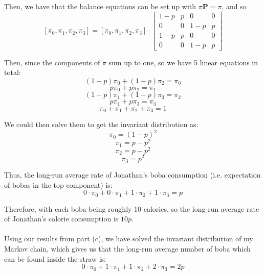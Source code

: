 \documentclass{article}
\begin{document}
Then, we have that the balance equations can be set up with $\pi\mathbf{P} = \pi$, and so
$$[\pi_0, \pi_1, \pi_2, \pi_3] = [\pi_0, \pi_1, \pi_2, \pi_3] \cdot
\begin{bmatrix}
	1-p & p & 0 & 0 \\
	0 & 0 & 1-p & p \\
	1-p & p & 0 & 0 \\
	0 & 0 & 1-p & p
\end{bmatrix} $$

Then, since the components of $\pi$ sum up to one, so we have 5 linear equations in total:
$$(1-p)\pi_0 + (1-p)\pi_2 = \pi_0 $$
$$p\pi_0 + p\pi_2 = \pi_1 $$
$$(1-p)\pi_1 + (1-p)\pi_3 = \pi_2 $$
$$p\pi_1 + p\pi_3 = \pi_3 $$
$$\pi_0 + \pi_1 + \pi_2 + \pi_3 = 1$$

We could then solve them to get the invariant distribution as:
$$\pi_0 = (1-p)^2$$
$$\pi_1 = p - p^2$$
$$\pi_2 = p - p^2$$
$$\pi_3 = p^2$$

Thus, the long-run average rate of Jonathan's boba consumption (i.e. expectation of bobas in the top component) is:
$$0\cdot\pi_0 + 0\cdot\pi_1 + 1\cdot\pi_2 + 1\cdot\pi_3 = p$$

Therefore, with each boba being roughly 10 calories, so the long-run average rate of Jonathan's calorie consumption is $10p$. \\



 \\

Using our results from part (c), we have solved the invariant distribution of my Markov chain, which gives us that the long-run average number of boba which can be found inside the straw is:
$$0\cdot\pi_0 + 1\cdot\pi_1 + 1\cdot\pi_2 + 2\cdot\pi_3 = 2p$$
\end{document}
